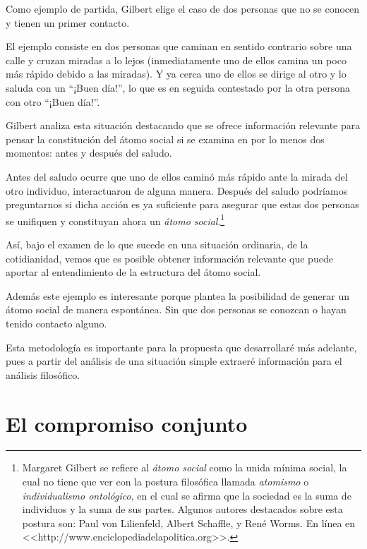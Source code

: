 \documentclass[oneside]{book}
\begin{document}
Como ejemplo de partida, Gilbert elige el caso de dos personas que no se conocen y tienen un primer contacto.

El ejemplo consiste en dos personas que caminan en sentido contrario sobre una calle y cruzan miradas a lo lejos (inmediatamente uno de ellos camina un poco más rápido debido a las miradas). Y ya cerca uno de ellos se dirige al otro y lo saluda con un “¡Buen día!”, lo que es en seguida contestado por la otra persona con otro “¡Buen día!”.

Gilbert analiza esta situación destacando que se ofrece información relevante para pensar la constitución del átomo social si se examina en por lo menos dos momentos: antes y después del saludo.

Antes del saludo ocurre que uno de ellos caminó más rápido ante la mirada del otro individuo, interactuaron de alguna manera. Después del saludo podríamos preguntarnos si dicha acción es ya suficiente para asegurar que estas dos personas se unifiquen y constituyan ahora un \textit{átomo social}.\footnote{Margaret Gilbert se refiere al \textit{átomo social} como la unida mínima social, la cual no tiene que ver con la postura filosófica llamada \textit{atomismo} o \textit{individualismo ontológico}, en el cual se afirma que la sociedad es la suma de individuos y la suma de sus partes. Algunos autores destacados sobre esta postura son: Paul von Lilienfeld, Albert Schaffle, y René Worms. En línea en <<http://www.enciclopediadelapolitica.org>>.}

Así, bajo el examen de lo que sucede en una situación ordinaria, de la cotidianidad, vemos que es posible obtener información relevante que puede aportar al entendimiento de la estructura del átomo social.

Además este ejemplo es interesante porque plantea la posibilidad de generar un átomo social de manera espontánea. Sin que dos personas se conozcan o hayan tenido contacto alguno.

Esta metodología es importante para la propuesta que desarrollaré más adelante, pues a partir del análisis de una situación simple extraeré información para el análisis filosófico.

\section{El compromiso conjunto}

	
\end{document}
